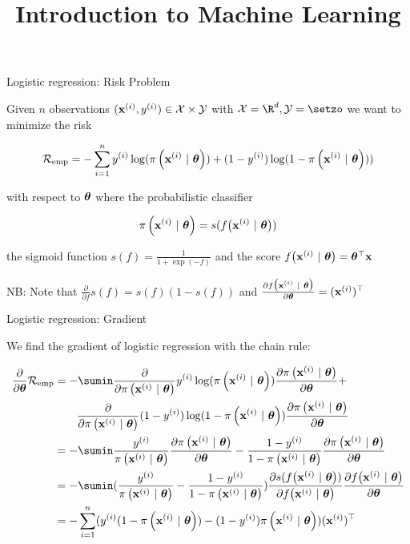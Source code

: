 \documentclass[11pt,compress,t,notes=noshow, xcolor=table]{beamer}
\title{Introduction to Machine Learning}
\begin{document}

\begin{frame}{Logistic regression: Risk Problem}

Given $n$ observations $(\mathbf{x}^{(i)}, y^{(i)}) \in \mathcal{X} \times \mathcal{Y}$ with  $\Xspace = \R^d, \Yspace = \setzo$ we want to minimize the risk 

$$
\mathcal{R}_{\text{emp}}   = 
-\sum^n_{i=1} y^{(i)}\log(\pi\left(\mathbf{x}^{(i)} ~|~ \bm{\theta}\right)) + (1-y^{(i)})\log(1-\pi\left(\mathbf{x}^{(i)} ~|~ \bm{\theta}\right)))
$$

with respect to $\bm{\theta}$ where the probabilistic classifier

$$
\pi\left(\mathbf{x}^{(i)} ~|~ \bm{\theta}\right) = s(f\big(\mathbf{x}^{(i)} ~|~ \bm{\theta}\big))
$$

the sigmoid function $s(f) = \frac{1}{1 + \exp(-f)}$ and the score $f\big(\mathbf{x}^{(i)} ~|~ \bm{\theta}\big) = \bm{\theta}^\top \mathbf{x}$

\vfill

NB: Note that $\frac{\partial}{\partial f} s(f) = s(f)(1-s(f))$ and $\frac{\partial f\big(\mathbf{x}^{(i)} ~|~ \bm{\theta}\big)}{\partial \bm{\theta}} = (\mathbf{x}^{(i)})^\top$

\end{frame}

\begin{frame}{Logistic regression: Gradient}

We find the gradient of logistic regression with the chain rule:

\vfill

{\small
\begin{align*}
\frac{\partial}{\partial\thetav}\riske  & =  
-\sumin \frac{\partial}{\partial\pixit }\yi\log(\pixit)\frac{\partial\pixit}{\partial \thetav} +  \\
& \qquad \frac{\partial}{\partial\pixit} (1-\yi)\log(1-\pixit)\frac{\partial\pixit}{\partial \thetav}\\
& =  
-\sumin \frac{\yi}{\pixit}\frac{\partial\pixit}{\partial \thetav} -  \frac{1-\yi}{1-\pixit}\frac{\partial\pixit}{\partial \thetav}\\
&=  
-\sumin (\frac{\yi}{\pixit} -  \frac{1-\yi}{1-\pixit})\frac{\partial s(\fxit)}{\partial  \fxit}\frac{\partial  \fxit}{\partial\thetav}\\
&=  
-\sum^n_{i=1} (\yi(1-\pixit)  -  (1-\yi)\pixit )(\xi)^\top\\
\end{align*}
}


\end{frame}
\end{document}
